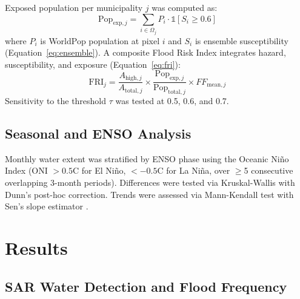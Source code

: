 \documentclass{article}
\begin{document}
Exposed population per municipality $j$ was computed as:
\begin{equation}
    \text{Pop}_{\text{exp},j} = \sum_{i \in \Omega_j} P_i \cdot \mathbb{1}[S_i \geq 0.6]
    \label{eq:pop_exposure}
\end{equation}
where $P_i$ is WorldPop population at pixel $i$ and $S_i$ is ensemble susceptibility (Equation~\ref{eq:ensemble}). A composite Flood Risk Index integrates hazard, susceptibility, and exposure (Equation~\ref{eq:fri}):
\begin{equation}
    \text{FRI}_j = \frac{A_{\text{high},j}}{A_{\text{total},j}} \times \frac{\text{Pop}_{\text{exp},j}}{\text{Pop}_{\text{total},j}} \times FF_{\text{mean},j}
    \label{eq:fri}
\end{equation}
Sensitivity to the threshold $\tau$ was tested at 0.5, 0.6, and 0.7.

\subsection{Seasonal and ENSO Analysis}

Monthly water extent was stratified by ENSO phase using the Oceanic Ni\~no Index (ONI $> 0.5$\textdegree{}C for El Ni\~no, $< -0.5$\textdegree{}C for La Ni\~na, over $\geq$5 consecutive overlapping 3-month periods). Differences were tested via Kruskal-Wallis with Dunn's post-hoc correction. Trends were assessed via Mann-Kendall test \citep{Mann1945} with Sen's slope estimator \citep{Sen1968}.

\section{Results}
\label{sec:results}

\subsection{SAR Water Detection and Flood Frequency}

\end{document}
